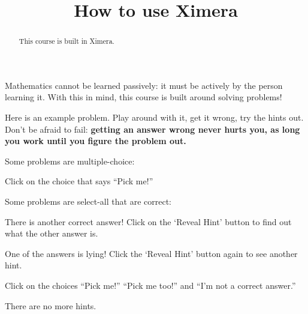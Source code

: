 \documentclass{ximera}
\title{How to use Ximera}
\begin{document}
\begin{abstract}
  This course is built in Ximera.
\end{abstract}\maketitle

Mathematics cannot be learned passively: it must be actively
by the person learning it.  With this in mind, this course is built
around solving problems!

Here is an example problem.  Play around with it, get it wrong, try
the hints out.  Don't be afraid to fail: \textbf{getting an answer wrong never
  hurts you, as long you work until you figure the problem out.}


\begin{problem}
  Some problems are multiple-choice:
  \begin{multipleChoice}
  \end{multipleChoice}
  \begin{hint}
    Click on the choice that says ``Pick me!''
  \end{hint}
\end{problem}


\begin{problem}
  Some problems are select-all that are correct:
  \begin{selectAll}
  \end{selectAll}
  \begin{feedback}
  There is another correct answer! Click on the `Reveal Hint' button to find out what the other answer is.
  \end{feedback}
  \begin{hint}
    One of the answers is lying! Click the `Reveal Hint' button again to see another hint.
  \end{hint}
  \begin{hint}
    Click on the choices ``Pick me!'' ``Pick me too!'' and ``I'm not a correct answer.''
  \end{hint}
  \begin{hint}
   There are no more hints.
  \end{hint}
\end{problem}
\end{document}
